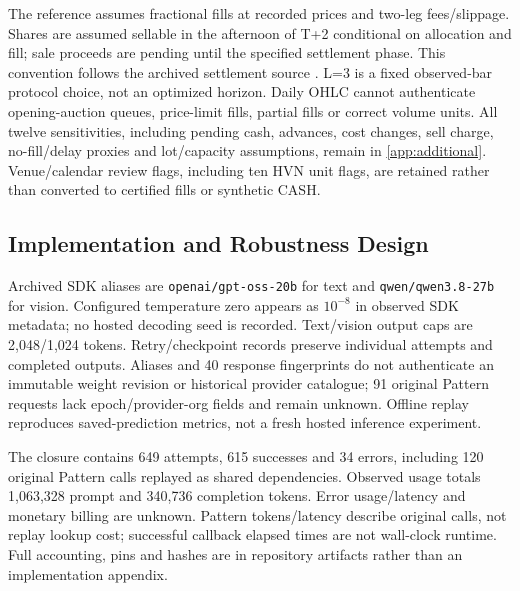 The reference assumes fractional fills at recorded prices and two-leg fees/slippage. Shares are assumed sellable in the afternoon of T+2 conditional on allocation and fill; sale proceeds are pending until the specified settlement phase. This convention follows the archived settlement source \cite{vsd2022settlement}. L=3 is a fixed observed-bar protocol choice, not an optimized horizon. Daily OHLC cannot authenticate opening-auction queues, price-limit fills, partial fills or correct volume units. All twelve sensitivities, including pending cash, advances, cost changes, sell charge, no-fill/delay proxies and lot/capacity assumptions, remain in \ref{app:additional}. Venue/calendar review flags, including ten HVN unit flags, are retained rather than converted to certified fills or synthetic CASH.

\subsection{Implementation and Robustness Design}
Archived SDK aliases are \texttt{openai/gpt-oss-20b} for text and \texttt{qwen/qwen3.8-27b} for vision. Configured temperature zero appears as $10^{-8}$ in observed SDK metadata; no hosted decoding seed is recorded. Text/vision output caps are 2,048/1,024 tokens. Retry/checkpoint records preserve individual attempts and completed outputs. Aliases and 40 response fingerprints do not authenticate an immutable weight revision or historical provider catalogue; 91 original Pattern requests lack epoch/provider-org fields and remain unknown. Offline replay reproduces saved-prediction metrics, not a fresh hosted inference experiment.

The closure contains 649 attempts, 615 successes and 34 errors, including 120 original Pattern calls replayed as shared dependencies. Observed usage totals 1,063,328 prompt and 340,736 completion tokens. Error usage/latency and monetary billing are unknown. Pattern tokens/latency describe original calls, not replay lookup cost; successful callback elapsed times are not wall-clock runtime. Full accounting, pins and hashes are in repository artifacts rather than an implementation appendix.
